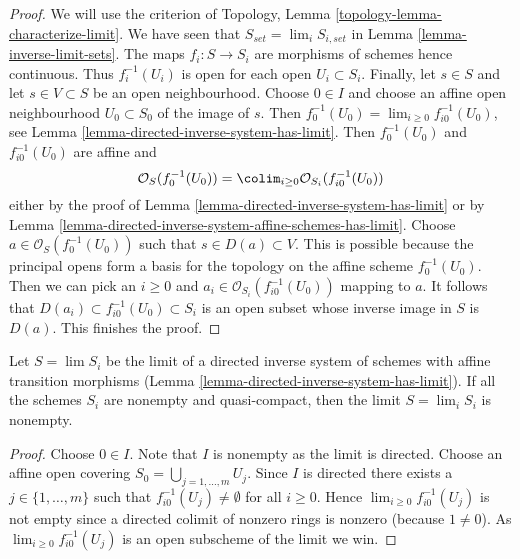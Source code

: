 \begin{proof}
We will use the criterion of
Topology, Lemma \ref{topology-lemma-characterize-limit}.
We have seen that $S_{set} = \lim_i S_{i, set}$ in
Lemma \ref{lemma-inverse-limit-sets}.
The maps $f_i : S \to S_i$ are morphisms of schemes
hence continuous. Thus $f_i^{-1}(U_i)$ is open for each
open $U_i \subset S_i$. Finally, 
let $s \in S$ and let $s \in V \subset S$ be an open
neighbourhood. Choose $0 \in I$ and choose an
affine open neighbourhood $U_0 \subset S_0$ of the image of $s$.
Then $f_0^{-1}(U_0) = \lim_{i \geq 0} f_{i0}^{-1}(U_0)$, see
Lemma \ref{lemma-directed-inverse-system-has-limit}.
Then $f_0^{-1}(U_0)$ and $f_{i0}^{-1}(U_0)$ are affine and
$$
\mathcal{O}_S(f_0^{-1}(U_0)) =
\colim_{i \geq 0} \mathcal{O}_{S_i}(f_{i0}^{-1}(U_0))
$$
either by the proof of
Lemma \ref{lemma-directed-inverse-system-has-limit}
or by
Lemma \ref{lemma-directed-inverse-system-affine-schemes-has-limit}.
Choose $a \in \mathcal{O}_S(f_0^{-1}(U_0))$ such that
$s \in D(a) \subset V$. This is possible because the principal
opens form a basis for the topology on the affine scheme $f_0^{-1}(U_0)$.
Then we can pick an $i \geq 0$ and
$a_i \in \mathcal{O}_{S_i}(f_{i0}^{-1}(U_0))$ mapping to $a$.
It follows that $D(a_i) \subset f_{i0}^{-1}(U_0) \subset S_i$
is an open subset whose inverse image in $S$ is $D(a)$.
This finishes the proof.
\end{proof}

\begin{lemma}
\label{lemma-limit-nonempty}
Let $S = \lim S_i$ be the limit of a directed inverse system
of schemes with affine transition morphisms
(Lemma \ref{lemma-directed-inverse-system-has-limit}).
If all the schemes $S_i$ are nonempty and quasi-compact,
then the limit $S = \lim_i S_i$ is nonempty.
\end{lemma}

\begin{proof}
Choose $0 \in I$. Note that $I$ is nonempty as the limit is directed.
Choose an affine open covering $S_0 = \bigcup_{j = 1, \ldots, m} U_j$.
Since $I$ is directed there exists a $j \in \{1, \ldots, m\}$
such that $f_{i0}^{-1}(U_j) \not = \emptyset$ for all
$i \geq 0$. Hence $\lim_{i \geq 0} f_{i0}^{-1}(U_j)$ is not
empty since a directed colimit of nonzero rings is nonzero
(because $1 \not = 0$). As $\lim_{i \geq 0} f_{i0}^{-1}(U_j)$
is an open subscheme of the limit we win.
\end{proof}

